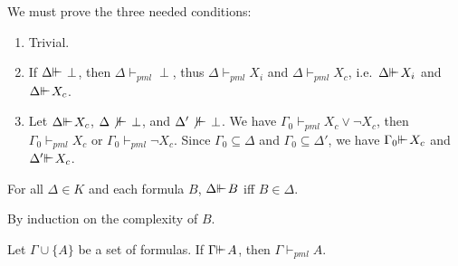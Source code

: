 \documentclass{jancl}
\begin{document}
\begin{proof*} We must prove the three needed conditions:
\begin{enumerate}
\item Trivial.

\item If ${\Delta} {\ifmmode{ {\vdash}\mkern-7.6mu
{\vdash}\mkern2mu}\else{ {\vdash}\kern-.28em
{\vdash}\hskip1pt\ }\fi\relax} \perp$, then ${\Delta} {\vdash}_{pml} \perp$, thus ${\Delta}
{\vdash}_{pml} X_i$ and ${\Delta} {\vdash}_{pml} X_c$, i.e.\   ${\Delta} {\ifmmode{ {\vdash}\mkern-7.6mu
{\vdash}\mkern2mu}\else{ {\vdash}\kern-.28em
{\vdash}\hskip1pt\ }\fi\relax} X_i$ and
${\Delta} {\ifmmode{ {\vdash}\mkern-7.6mu
{\vdash}\mkern2mu}\else{ {\vdash}\kern-.28em
{\vdash}\hskip1pt\ }\fi\relax} X_c$.

\item Let ${\Delta} {\ifmmode{ {\vdash}\mkern-7.6mu
{\vdash}\mkern2mu}\else{ {\vdash}\kern-.28em
{\vdash}\hskip1pt\ }\fi\relax} X_c$, ${\Delta} \not {\ifmmode{ {\vdash}\mkern-7.6mu
{\vdash}\mkern2mu}\else{ {\vdash}\kern-.28em
{\vdash}\hskip1pt\ }\fi\relax} \perp$, and ${\Delta}'
\not {\ifmmode{ {\vdash}\mkern-7.6mu
{\vdash}\mkern2mu}\else{ {\vdash}\kern-.28em
{\vdash}\hskip1pt\ }\fi\relax} \perp$. We have ${\Gamma}_0 {\vdash}_{pml} X_c {\vee} \neg X_c$,
then ${\Gamma}_0 {\vdash}_{pml} X_c$ or ${\Gamma}_0 {\vdash}_{pml} \neg X_c$. Since ${\Gamma}_0
{\subseteq} {\Delta}$ and ${\Gamma}_0 {\subseteq} {\Delta}'$, we have ${\Gamma}_0 {\ifmmode{ {\vdash}\mkern-7.6mu
{\vdash}\mkern2mu}\else{ {\vdash}\kern-.28em
{\vdash}\hskip1pt\ }\fi\relax} X_c$
and ${\Delta}' {\ifmmode{ {\vdash}\mkern-7.6mu
{\vdash}\mkern2mu}\else{ {\vdash}\kern-.28em
{\vdash}\hskip1pt\ }\fi\relax} X_c$.
\end{enumerate}
\end{proof*}

\begin{lemma}
For all ${\Delta} \in K$ and each formula $B$, ${\Delta} {\ifmmode{ {\vdash}\mkern-7.6mu
{\vdash}\mkern2mu}\else{ {\vdash}\kern-.28em
{\vdash}\hskip1pt\ }\fi\relax} B$ iff $B \in {\Delta}$.
\end{lemma}

\begin{proof*}
By induction on the complexity of $B$.
\end{proof*}

\begin{theorem}\label{comp}
Let ${\Gamma} \cup \{ A \}$ be a set of formulas.
If ${\Gamma} {\ifmmode{ {\vdash}\mkern-7.6mu
{\vdash}\mkern2mu}\else{ {\vdash}\kern-.28em
{\vdash}\hskip1pt\ }\fi\relax} A$, then ${\Gamma} {\vdash}_{pml} A$.
\end{theorem}
\end{document}

